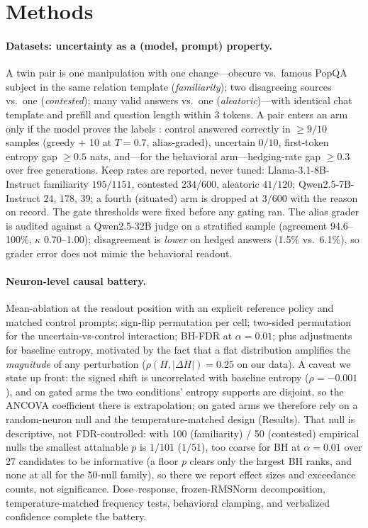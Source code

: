 \documentclass{article}
\newcommand{\lm}{Llama-3.1-8B-Instruct}
\newcommand{\qw}{Qwen2.5-7B-Instruct}
\begin{document}
\section{Methods}
\paragraph{Datasets: uncertainty as a (model, prompt) property.}
A twin pair is one manipulation with one change---obscure vs.\ famous PopQA \citep{mallen2023popqa} subject
in the same relation template (\emph{familiarity}); two disagreeing sources vs.\ one
\citep{xie2024conflictqa} (\emph{contested}); many valid answers vs.\ one (\emph{aleatoric})---with
identical chat template and prefill and question length within 3 tokens. A pair enters an arm only if the
model proves the labels \citep{kadavath2022know,gekhman2024slick}: control answered correctly in
$\geq 9/10$ samples (greedy $+$ 10 at $T{=}0.7$, alias-graded), uncertain $0/10$, first-token entropy gap
$\geq 0.5$ nats, and---for the behavioral arm---hedging-rate gap $\geq 0.3$ over free generations. Keep
rates are reported, never tuned: \lm{} familiarity $195/1151$, contested $234/600$, aleatoric $41/120$;
\qw{} $24$, $178$, $39$; a fourth (situated) arm is dropped at $3/600$ with the reason on record. The
gate thresholds were fixed before any gating ran. The alias grader is audited against a Qwen2.5-32B judge
on a stratified sample (agreement 94.6--100\%, $\kappa$ 0.70--1.00); disagreement is \emph{lower} on
hedged answers (1.5\% vs.\ 6.1\%), so grader error does not mimic the behavioral readout.

\paragraph{Neuron-level causal battery.}
Mean-ablation at the readout position with an explicit reference policy and matched control prompts;
sign-flip permutation per cell; two-sided permutation for the uncertain-vs-control interaction; BH-FDR at
$\alpha{=}0.01$; plus adjustments for baseline entropy, motivated by the fact that a flat distribution
amplifies the \emph{magnitude} of any perturbation ($\rho(H,|\Delta H|){=}0.25$ on our data). A caveat we
state up front: the signed shift is uncorrelated with baseline entropy ($\rho{=}{-}0.001$), and on gated
arms the two conditions' entropy supports are disjoint, so the ANCOVA coefficient there is extrapolation;
on gated arms we therefore rely on a random-neuron null and the temperature-matched design (Results).
That null is descriptive, not FDR-controlled: with 100 (familiarity) / 50 (contested) empirical nulls the
smallest attainable $p$ is $1/101$ ($1/51$), too coarse for BH at $\alpha{=}0.01$ over 27 candidates to
be informative (a floor $p$ clears only the largest BH ranks, and none at all for the 50-null family),
so there we report effect sizes and exceedance counts, not significance.
Dose--response, frozen-RMSNorm decomposition, temperature-matched frequency tests, behavioral clamping,
and verbalized confidence complete the battery.
\end{document}

